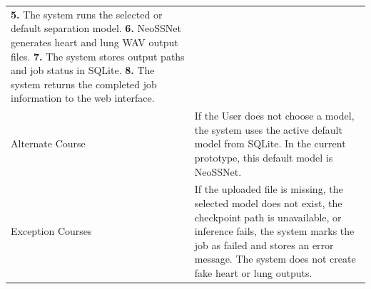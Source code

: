 \begin{longtable}{@{}p{} p{}@{}}
  \textbf{5.} The system runs the selected or default separation model. \newline
  \textbf{6.} NeoSSNet generates heart and lung WAV output files. \newline
  \textbf{7.} The system stores output paths and job status in SQLite. \newline
  \textbf{8.} The system returns the completed job information to the web interface. \\
  Alternate Course & If the User does not choose a model, the system uses the active default model from SQLite. In the current prototype, this default model is NeoSSNet. \\
  Exception Courses & If the uploaded file is missing, the selected model does not exist, the checkpoint path is unavailable, or inference fails, the system marks the job as failed and stores an error message. The system does not create fake heart or lung outputs. \\
\end{longtable}

